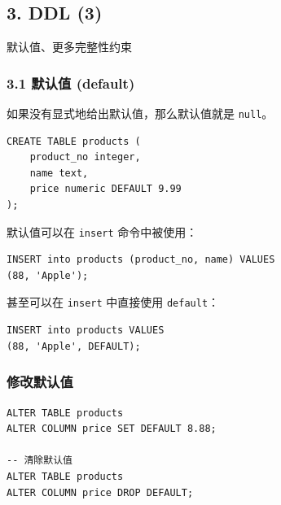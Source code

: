 \documentclass[aspectratio=169, 14pt]{beamer}
\begin{document}
\begin{frame}
    \section{\textcolor{darkmidnightblue}{3. DDL (3)}} 
    默认值、更多完整性约束

\end{frame}

\begin{frame}[fragile]
    \frametitle{3.1 默认值 (default)}
如果没有显式地给出默认值，那么默认值就是 \texttt{null}。

\begin{verbatim}
CREATE TABLE products (
    product_no integer,
    name text,
    price numeric DEFAULT 9.99
);
\end{verbatim}

\end{frame}

\begin{frame}[fragile]
    默认值可以在 \texttt{insert} 命令中被使用：

    \begin{verbatim}
INSERT into products (product_no, name) VALUES
(88, 'Apple');
    \end{verbatim}

甚至可以在 \texttt{insert} 中直接使用 \texttt{default}：

\begin{verbatim}
INSERT into products VALUES
(88, 'Apple', DEFAULT);
\end{verbatim}

\end{frame}

\begin{frame}[fragile]
    \frametitle{修改默认值}

    \begin{verbatim}
ALTER TABLE products 
ALTER COLUMN price SET DEFAULT 8.88;

-- 清除默认值
ALTER TABLE products 
ALTER COLUMN price DROP DEFAULT;
    \end{verbatim}
    
\end{frame}
\end{document}
